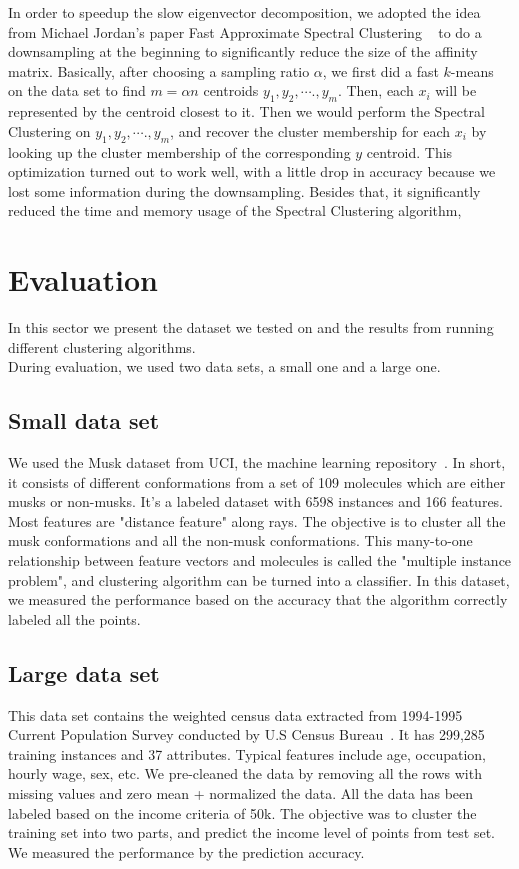 \documentclass{acm_proc_article-sp}
\begin{document}
In order to speedup the slow eigenvector decomposition, we adopted the idea from Michael Jordan's paper Fast Approximate Spectral Clustering ~\cite{yan2009fast} to do a downsampling at the beginning to significantly reduce the size of the affinity matrix. Basically, after choosing a sampling ratio $\alpha$, we first did a fast $k$-means on the data set to find $m = \alpha n$ centroids $y_1, y_2, \cdots., y_m$. Then, each $x_i$ will be represented by the centroid closest to it. Then we would perform the Spectral Clustering on $y_1, y_2, \cdots., y_m$, and recover the cluster membership for each $x_i$ by looking up the cluster membership of the corresponding $y$ centroid. This optimization turned out to work well, with a little drop in accuracy because we lost some information during the downsampling. Besides that, it significantly reduced the time and memory usage of the Spectral Clustering algorithm,


\section{Evaluation}


In this sector we present the dataset we tested on and the results from running different clustering algorithms.\\
During evaluation, we used two data sets, a small one and a large one.
\subsection{Small data set}
We used the Musk dataset from UCI, the machine learning repository~\cite{Lichman:2013}. In short, it consists of different conformations from a set of 109 molecules which are either musks or non-musks. It's a labeled dataset with 6598 instances and 166 features. Most features are "distance feature" along rays.
The objective is to cluster all the musk conformations and all the non-musk conformations. This many-to-one relationship between feature vectors and molecules is called the "multiple instance problem", and clustering algorithm can be turned into a classifier. In this dataset, we measured the performance based on the accuracy that the algorithm correctly labeled all the points.

\subsection{Large data set}
This data set contains the weighted census data extracted from 1994-1995 Current Population Survey conducted by U.S Census Bureau~\cite{Lichman:2013}. It has 299,285 training instances and 37 attributes. Typical features include age, occupation, hourly wage, sex, etc. We pre-cleaned the data by removing all the rows with missing values and zero mean + normalized the data. All the data has been labeled based on the income criteria of 50k. The objective was to cluster the training set into two parts, and predict the income level of points from test set. We measured the performance by the prediction accuracy.
\end{document}
